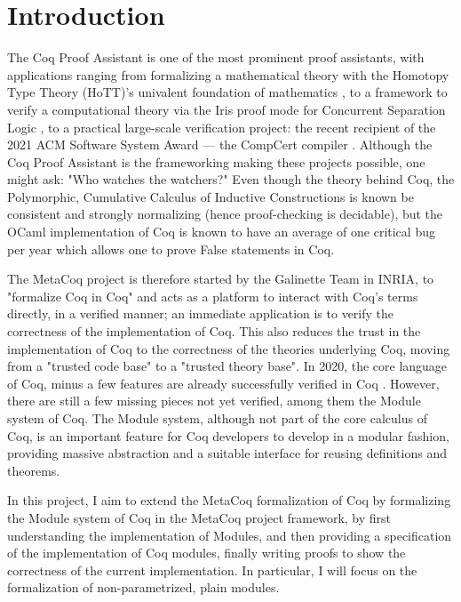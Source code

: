 \chapter{Introduction}

The Coq Proof Assistant is one of the most prominent proof assistants, with
applications ranging from formalizing a mathematical theory with the Homotopy
Type Theory (HoTT)'s univalent foundation of mathematics
, to a framework to verify a
computational theory via the Iris proof mode for Concurrent Separation Logic
, to a practical large-scale verification project: the
recent recipient of the 2021 ACM Software System Award --- the CompCert
compiler . Although the
Coq Proof Assistant is the frameworking making these projects possible, one
might ask: "Who watches the watchers?"  Even though the theory behind Coq, the Polymorphic,
Cumulative Calculus of Inductive Constructions is known be consistent and
strongly normalizing (hence proof-checking is decidable), but the OCaml
implementation of Coq is known to have an average of one critical bug per year
which allows one to prove False statements in Coq.

The MetaCoq project  is therefore
started by the Galinette Team in INRIA, to "formalize Coq in Coq" and acts as a
platform to interact with Coq's terms directly, in a verified manner; an
immediate application is to verify the correctness of the implementation of Coq.
This also reduces the trust in the implementation of Coq to the correctness of
the theories underlying Coq, moving from a "trusted code base" to a "trusted
theory base".  In 2020, the core language of Coq, minus a few features are
already successfully verified in Coq . However, there
are still a few missing pieces not yet verified, among them the Module system of
Coq. The Module system, although not part of the core calculus of Coq, is an
important feature for Coq developers to develop in a modular fashion, providing
massive abstraction and a suitable interface for reusing definitions and
theorems.

In this project, I aim to extend the MetaCoq formalization of Coq by formalizing
the Module system of Coq in the MetaCoq project framework, by first
understanding the implementation of Modules, and then providing a specification
of the implementation of Coq modules, finally writing proofs to show the
correctness of the current implementation.  In particular, I will focus on the
formalization of non-parametrized, plain modules.

